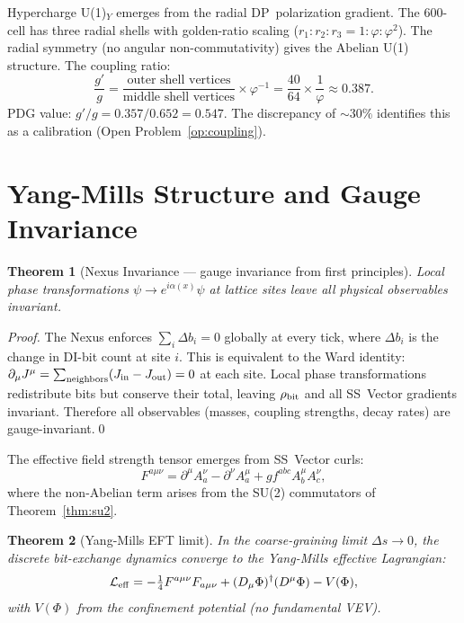 \documentclass[11pt,letterpaper]{article}
\newtheorem{theorem}{Theorem}[section]
\newcommand{\phig}{\varphi}
\begin{document}
Hypercharge U(1)$_Y$ emerges from the radial DP~polarization gradient.
The 600-cell has three radial shells with golden-ratio scaling
($r_1 : r_2 : r_3 = 1 : \phig : \phig^2$).  The radial symmetry (no
angular non-commutativity) gives the Abelian U(1) structure.
The coupling ratio:
\begin{equation}
\frac{g'}{g}
= \frac{\text{outer shell vertices}}{\text{middle shell vertices}}
  \times\phig^{-1}
= \frac{40}{64}\times\frac{1}{\phig}
\approx 0.387.
\label{eq:coupling_ratio}
\end{equation}
PDG value: $g'/g = 0.357/0.652 = 0.547$.  The discrepancy of
$\sim30\%$ identifies this as a calibration (Open
Problem~\ref{op:coupling}).

\section{Yang-Mills Structure and Gauge Invariance}

\begin{theorem}[Nexus Invariance --- gauge invariance from first principles]
\label{thm:nexus}
Local phase transformations $\psi \to e^{i\alpha(x)}\psi$ at lattice
sites leave all physical observables invariant.
\end{theorem}

\begin{proof}
The Nexus enforces $\sum_i \Delta b_i = 0$ globally at every tick,
where $\Delta b_i$ is the change in DI-bit count at site $i$.  This
is equivalent to the Ward identity: $\partial_\mu J^\mu
= \sum_{\rm neighbors}(J_{\rm in} - J_{\rm out}) = 0$ at each site.
Local phase transformations redistribute bits but conserve their
total, leaving $\rho_{\rm bit}$ and all SS~Vector gradients invariant.
Therefore all observables (masses, coupling strengths, decay rates)
are gauge-invariant.\qed
\end{proof}

The effective field strength tensor emerges from SS~Vector curls:
\begin{equation}
F^{a\mu\nu}
= \partial^\mu A^\nu_a - \partial^\nu A^\mu_a + g f^{abc}A^\mu_b A^\nu_c,
\label{eq:Fmunu}
\end{equation}
where the non-Abelian term arises from the SU(2) commutators of
Theorem~\ref{thm:su2}.

\begin{theorem}[Yang-Mills EFT limit]
\label{thm:ym}
In the coarse-graining limit $\Delta s \to 0$, the discrete bit-exchange
dynamics converge to the Yang-Mills effective Lagrangian:
\begin{equation}
\mathcal{L}_{\rm eff}
= -\tfrac{1}{4}F^{a\mu\nu}F_{a\mu\nu}
  + (D_\mu\Phi)^\dagger(D^\mu\Phi) - V(\Phi),
\label{eq:Leff}
\end{equation}
with $V(\Phi)$ from the confinement potential (no fundamental VEV).
\end{theorem}
\end{document}
